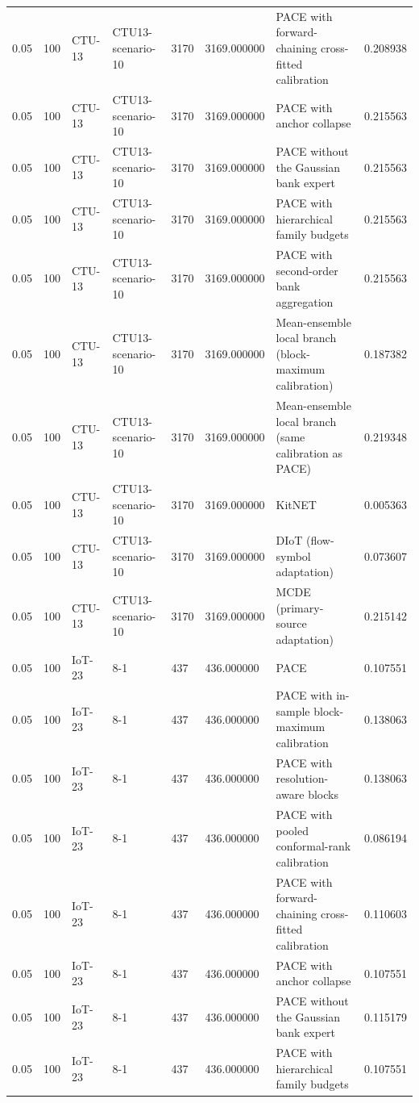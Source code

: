 \begin{tabular}{llllllll}
0.05 & 100 & CTU-13 & CTU13-scenario-10 & 3170 & 3169.000000 & PACE with forward-chaining cross-fitted calibration & 0.208938 \\
0.05 & 100 & CTU-13 & CTU13-scenario-10 & 3170 & 3169.000000 & PACE with anchor collapse & 0.215563 \\
0.05 & 100 & CTU-13 & CTU13-scenario-10 & 3170 & 3169.000000 & PACE without the Gaussian bank expert & 0.215563 \\
0.05 & 100 & CTU-13 & CTU13-scenario-10 & 3170 & 3169.000000 & PACE with hierarchical family budgets & 0.215563 \\
0.05 & 100 & CTU-13 & CTU13-scenario-10 & 3170 & 3169.000000 & PACE with second-order bank aggregation & 0.215563 \\
0.05 & 100 & CTU-13 & CTU13-scenario-10 & 3170 & 3169.000000 & Mean-ensemble local branch (block-maximum calibration) & 0.187382 \\
0.05 & 100 & CTU-13 & CTU13-scenario-10 & 3170 & 3169.000000 & Mean-ensemble local branch (same calibration as PACE) & 0.219348 \\
0.05 & 100 & CTU-13 & CTU13-scenario-10 & 3170 & 3169.000000 & KitNET & 0.005363 \\
0.05 & 100 & CTU-13 & CTU13-scenario-10 & 3170 & 3169.000000 & DIoT (flow-symbol adaptation) & 0.073607 \\
0.05 & 100 & CTU-13 & CTU13-scenario-10 & 3170 & 3169.000000 & MCDE (primary-source adaptation) & 0.215142 \\
0.05 & 100 & IoT-23 & 8-1 & 437 & 436.000000 & PACE & 0.107551 \\
0.05 & 100 & IoT-23 & 8-1 & 437 & 436.000000 & PACE with in-sample block-maximum calibration & 0.138063 \\
0.05 & 100 & IoT-23 & 8-1 & 437 & 436.000000 & PACE with resolution-aware blocks & 0.138063 \\
0.05 & 100 & IoT-23 & 8-1 & 437 & 436.000000 & PACE with pooled conformal-rank calibration & 0.086194 \\
0.05 & 100 & IoT-23 & 8-1 & 437 & 436.000000 & PACE with forward-chaining cross-fitted calibration & 0.110603 \\
0.05 & 100 & IoT-23 & 8-1 & 437 & 436.000000 & PACE with anchor collapse & 0.107551 \\
0.05 & 100 & IoT-23 & 8-1 & 437 & 436.000000 & PACE without the Gaussian bank expert & 0.115179 \\
0.05 & 100 & IoT-23 & 8-1 & 437 & 436.000000 & PACE with hierarchical family budgets & 0.107551 \\

\end{tabular}
